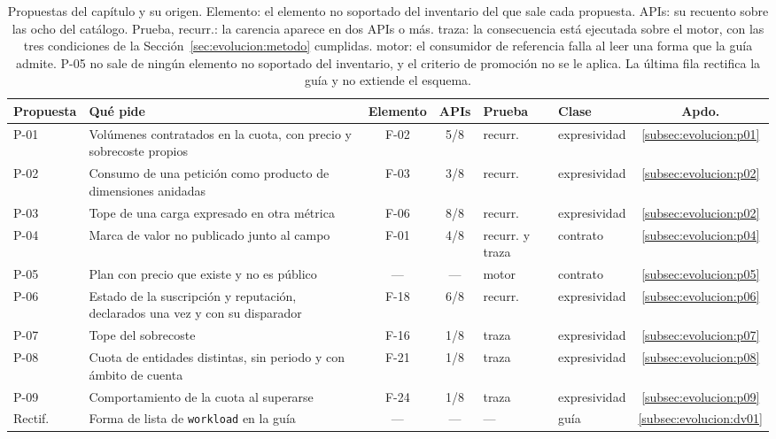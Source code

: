 \begin{table}[H]
\centering
\small
\setlength{\tabcolsep}{3pt}
\begin{tabular}{|l|p{}|c|c|l|l|c|}
\hline
\textbf{Propuesta} & \textbf{Qué pide} & \textbf{Elemento} & \textbf{APIs} & \textbf{Prueba} & \textbf{Clase} & \textbf{Apdo.} \\
\hline
P-01 & Volúmenes contratados en la cuota, con precio y sobrecoste propios & F-02 & 5/8 & recurr. & expresividad & \ref{subsec:evolucion:p01} \\
\hline
P-02 & Consumo de una petición como producto de dimensiones anidadas & F-03 & 3/8 & recurr. & expresividad & \ref{subsec:evolucion:p02} \\
\hline
P-03 & Tope de una carga expresado en otra métrica & F-06 & 8/8 & recurr. & expresividad & \ref{subsec:evolucion:p02} \\
\hline
P-04 & Marca de valor no publicado junto al campo & F-01 & 4/8 & recurr. y traza & contrato & \ref{subsec:evolucion:p04} \\
\hline
P-05 & Plan con precio que existe y no es público & --- & --- & motor & contrato & \ref{subsec:evolucion:p05} \\
\hline
P-06 & Estado de la suscripción y reputación, declarados una vez y con su disparador & F-18 & 6/8 & recurr. & expresividad & \ref{subsec:evolucion:p06} \\
\hline
P-07 & Tope del sobrecoste & F-16 & 1/8 & traza & expresividad & \ref{subsec:evolucion:p07} \\
\hline
P-08 & Cuota de entidades distintas, sin periodo y con ámbito de cuenta & F-21 & 1/8 & traza & expresividad & \ref{subsec:evolucion:p08} \\
\hline
P-09 & Comportamiento de la cuota al superarse & F-24 & 1/8 & traza & expresividad & \ref{subsec:evolucion:p09} \\
\hline
Rectif. & Forma de lista de \texttt{workload} en la guía & --- & --- & --- & guía & \ref{subsec:evolucion:dv01} \\
\hline
\end{tabular}
\caption{Propuestas del capítulo y su origen. Elemento: el elemento no soportado del inventario del que sale cada propuesta. APIs: su recuento sobre las ocho del catálogo. Prueba, recurr.: la carencia aparece en dos APIs o más. traza: la consecuencia está ejecutada sobre el motor, con las tres condiciones de la Sección~\ref{sec:evolucion:metodo} cumplidas. motor: el consumidor de referencia falla al leer una forma que la guía admite. P-05 no sale de ningún elemento no soportado del inventario, y el criterio de promoción no se le aplica. La última fila rectifica la guía y no extiende el esquema.}
\label{tab:propuestas}
\end{table}

